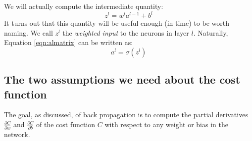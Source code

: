 \documentclass[11pt]{article}
\begin{document}
We will actually compute the intermediate quantity:
\begin{equation}
  z^l = w^l a^{l-1} + b^l
\end{equation}
It turns out that this quantity will be useful enough (in time) to be worth naming. We call \(z^l\) the \emph{weighted input} to the neurons in layer \(l\). Naturally, Equation \ref{eqn:almatrix} can be written as:
\begin{equation} 
a^l = \sigma(z^l)
\end{equation}


\subsection{The two assumptions we need about the cost function}
\label{sec:org2acb1ac}
The goal, as discussed, of back propagation is to compute the partial derivatives \(\frac{\partial C}{\partial w}\) and \(\frac{\partial C}{\partial b}\) of the cost function \(C\) with respect to any weight or bias in the network. 
\end{document}
